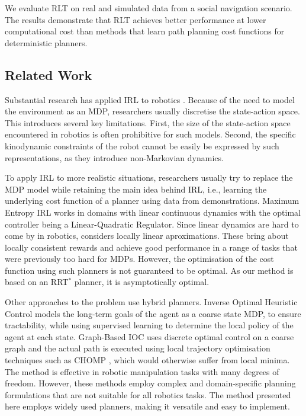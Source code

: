 \documentclass[a4paper,11pt]{report}
\begin{document}
We evaluate RLT on real and simulated data from a social navigation scenario. The results demonstrate that RLT achieves better performance at lower computational cost than methods that learn path planning cost functions for deterministic planners.

\subsection{Related Work}

Substantial research has applied IRL to robotics \cite{henry2010learning,abbeel2008apprenticeship,vasquez2014inverse}. Because of the need to model the environment as an MDP, researchers usually discretise the state-action space. This introduces several key limitations. First, the size of the state-action space encountered in robotics is often prohibitive for such models. Second, the specific kinodynamic constraints of the robot cannot be easily be expressed by such representations, as they introduce non-Markovian dynamics. 


To apply IRL to more realistic situations, researchers usually try to replace the MDP model while retaining the main idea behind IRL, i.e., learning the underlying cost function of a planner using data from demonstrations. Maximum Entropy IRL \cite{ziebart2010modelingthesis} works in domains with linear continuous dynamics with the optimal controller being a Linear-Quadratic Regulator. Since linear dynamics are hard to come by in robotics, \cite{2012-cioc} considers locally linear aproximations. These bring about locally consistent rewards and achieve good performance in a range of tasks that were previously too hard for MDPs. However, the optimisation of the cost function using such planners is not guaranteed to be optimal. As our method is based on an RRT$^*$ planner, it is asymptotically optimal.

Other approaches to the problem use hybrid planners. Inverse Optimal Heuristic Control \cite{ratliff2009inverse} models the long-term goals of the agent as a coarse state MDP, to ensure tractability, while using supervised learning to determine the local policy of the agent at each state. Graph-Based IOC \cite{byravan2015graph} uses discrete optimal control on a coarse graph and the actual path is executed using local trajectory optimisation techniques such as CHOMP \cite{ratliff2009chomp}, which would otherwise suffer from local minima. The method is effective in robotic manipulation tasks with many degrees of freedom.  However, these methods employ complex and domain-specific planning formulations that are not suitable for all robotics tasks. The method presented here employs widely used planners, making it versatile and easy to implement. 
\end{document}
